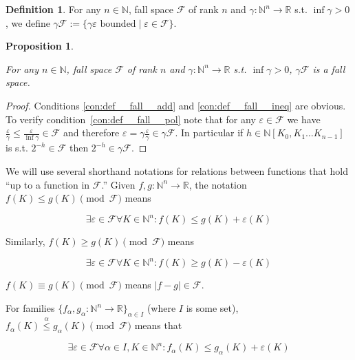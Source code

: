 \documentclass[11pt]{article}
\numberwithin{equation}{section}
\theoremstyle{definition}
\newtheorem{definition}{Definition}[section]
\theoremstyle{plain}
\newtheorem{proposition}{Proposition}[section]
\newcommand{\Nats}{\mathbb{N}}
\newcommand{\Reals}{\mathbb{R}}
\newcommand{\NatPoly}{\Nats[K_0, K_1 \ldots K_{n-1}]}
\newcommand{\NatFun}{\Nats^n \rightarrow}
\newcommand{\Abs}[1]{\lvert #1 \rvert}
\newcommand{\Fall}{\mathcal{F}}
\begin{document}
\begin{samepage}
\begin{definition}

For any $n \in \Nats$, fall space $\Fall$ of rank $n$ and $\gamma: \NatFun \Reals$ s.t. $\inf \gamma > 0$, we define $\gamma \Fall := \{\gamma \varepsilon \text{ bounded} \mid \varepsilon \in \Fall\}$.

\end{definition}
\end{samepage}

\begin{samepage}
\begin{proposition}
\label{prp:tbd}

For any $n \in \Nats$, fall space $\Fall$ of rank $n$ and $\gamma: \NatFun \Reals$ s.t. $\inf \gamma > 0$, $\gamma \Fall$ is a fall space.

\end{proposition}
\end{samepage}

\begin{proof}

Conditions \ref{con:def__fall__add} and \ref{con:def__fall__ineq} are obvious. To verify condition~\ref{con:def__fall__pol} note that for any $\varepsilon \in \Fall$ we have ${\frac{\varepsilon}{\gamma} \leq \frac{\varepsilon}{\inf \gamma} \in \Fall}$ and therefore $\varepsilon = \gamma \frac{\varepsilon}{\gamma} \in \gamma \Fall$. In particular if $h \in \NatPoly$ is s.t. $2^{-h} \in \Fall$ then $2^{-h} \in \gamma \Fall$.
%
\end{proof}

We will use several shorthand notations for relations between functions that hold \enquote{up to a function in ${\Fall}$.} Given $f,g: \NatFun \Reals$, the notation ${f(K) \leq g(K) \pmod \Fall}$ means 

\[\exists \varepsilon \in \Fall \forall K \in \Nats^n: f(K) \leq g(K) + \varepsilon(K)\]

Similarly, $f(K) \geq g(K) \pmod \Fall$ means 

\[\exists \varepsilon \in \Fall \forall K \in \Nats^n: f(K) \geq g(K) - \varepsilon(K)\]

$f(K) \equiv g(K) \pmod \Fall$ means $\Abs{f-g} \in \Fall$.

For families ${\{f_\alpha,g_\alpha: \NatFun \Reals\}_{\alpha \in I}}$ (where ${I}$ is some set), ${f_\alpha(K) \overset{\alpha}{\leq} g_\alpha(K) \pmod \Fall}$ means that 

\[\exists \varepsilon \in \Fall \forall \alpha \in I, K \in \Nats^n: f_\alpha(K) \leq g_\alpha(K) + \varepsilon(K)\]
\end{document}
